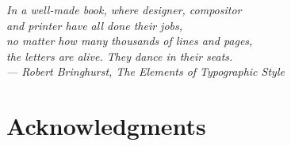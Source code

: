 
\begin{flushright}
    {\slshape
    In a well-made book, where designer, compositor \\
    and printer have all done their jobs, \\
    no matter how many thousands of lines and pages, \\
    the letters are alive. They dance in their seats. \\\medskip
    \upshape --- Robert Bringhurst, \emph{The Elements of Typographic Style}
    }
\end{flushright}

\bigskip

\begingroup
\let\clearpage\relax
\let\cleardoublepage\relax
\let\cleardoublepage\relax
\chapter*{Acknowledgments}

\lipsum[1-2]

\endgroup
